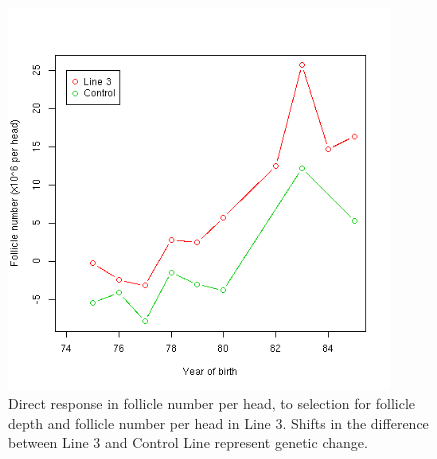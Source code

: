 %

\begin{figure}[!htp]
  \centering
   \includegraphics[width=0.9\textwidth]{dgl3fnt.png}
  \caption{Direct response in follicle number per head, to selection for follicle depth and follicle number per head in Line 3. Shifts in the difference between Line 3 and Control Line represent genetic change.}
  \label{fig:dgl3fnt}
\end{figure}

%

